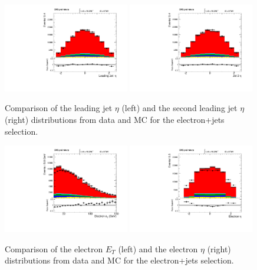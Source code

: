\begin{figure}[h!t]
  {\centering
    \includegraphics[width=0.49\textwidth]{figs/n-1_plots_el/el_jetld_eta.pdf}
    \includegraphics[width=0.49\textwidth]{figs/n-1_plots_el/el_jetnt_eta.pdf}
    \caption{Comparison of the leading jet $\eta $ (left) and the
      second leading jet $\eta $ (right) distributions from data and MC for the electron+jets
      selection. 
      }
    \label{fig:elec_jet_eta}}
\end{figure}
\begin{figure}[h!t]
  {\centering
    \includegraphics[width=0.49\textwidth]{figs/n-1_plots_el/el_W_electron_et.pdf}
    \includegraphics[width=0.49\textwidth]{figs/n-1_plots_el/el_W_electron_eta.pdf}
    \caption{Comparison of the electron $E_{T} $ (left) and the
    electron $\eta $ (right) distributions from data and MC for the
    electron+jets selection. 
    }
   \label{fig:elec_electron}}
\end{figure}
